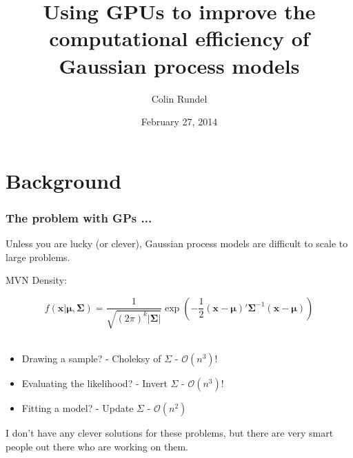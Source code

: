 \documentclass[t]{beamer}\usepackage[]{graphicx}\usepackage[]{color}
\title[GPU GPs]{Using GPUs to improve the computational efficiency of Gaussian process models}
\author{Colin Rundel}
\date{February 27, 2014}
\institute[Duke]{Duke University}
\begin{document}
\begin{frame}[plain]
\titlepage
\end{frame}





\section{Background}
\addtocounter{framenumber}{-1} 


\begin{frame}
\frametitle{The problem with GPs ...}

Unless you are lucky (or clever), Gaussian process models are difficult to scale to large problems.

\pause \vspace{7mm}

MVN Density:

\[
  f(\bm{x}|\bm{\mu},\bm\Sigma) = \frac{1}{\sqrt{(2\pi)^k|\bm{\Sigma}|}}  \exp\left(-\frac{1}{2} (\bm{x}-\bm{\mu})' \bm{\Sigma}^{-1} (\bm{x}-\bm{\mu}) \right)
\]
~\\

\begin{itemize}
\pause \item Drawing a sample? \pause - Choleksy of $\Sigma$ \pause - $\mathcal{O}\left(n^3\right)!$
\vspace{2mm}
\pause \item Evaluating the likelihood? \pause - Invert $\Sigma$ \pause - $\mathcal{O}\left(n^3\right)$!
\vspace{2mm}
\pause \item Fitting a model? \pause - Update $\Sigma$ \pause - $\mathcal{O}\left(n^2\right)$
\end{itemize}

\pause \vspace{2mm}

I don't have any clever solutions for these problems, but there are very smart people out there who are working on them.


\end{frame}

\end{document}
